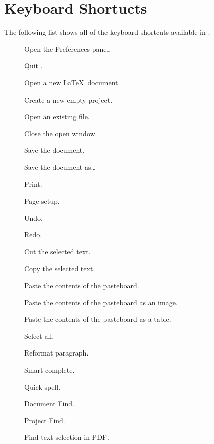 \chapter{Keyboard Shortucts}
\label{shortcuts}

The following list shows all of the keyboard shortcuts available in \texnicle.

\begin{description}
	\item[\keys{\cmdkey + {,}}] Open the Preferences panel.
	\item[] Quit \texnicle.
	\item[] Open a new \LaTeX\ document.
	\item[] Create a new empty project.
	\item[] Open an existing file.
	\item[] Close the open window.
	\item[] Save the document.
	\item[] Save the document as\ldots
	\item[] Print.
	\item[] Page setup.
	\item[] Undo.	
	\item[] Redo.
	\item[] Cut the selected text.
	\item[] Copy the selected text.
	\item[] Paste the contents of the pasteboard.
	\item[] Paste the contents of the pasteboard as an image.
	\item[] Paste the contents of the pasteboard as a table.
	\item[] Select all.
	\item[] Reformat paragraph.
	\item[\keys{\esckey}] Smart complete.
	\item[] Quick spell.
	\item[] Document Find.
	\item[] Project Find.
	\item[] Find text selection in PDF{.}

\end{description}

